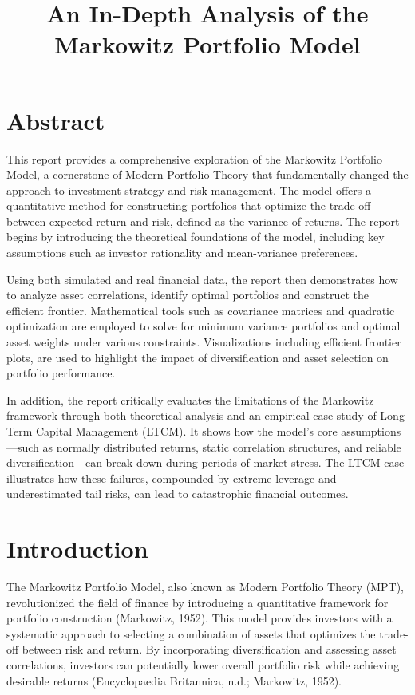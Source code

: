 \documentclass[11pt]{article}
\begin{document}
\title{An In-Depth Analysis of the Markowitz Portfolio Model}
\author{}
\date{}
\maketitle

\section{Abstract}
This report provides a comprehensive exploration of the Markowitz Portfolio Model, a cornerstone of Modern Portfolio Theory that fundamentally changed the approach to investment strategy and risk management. The model offers a quantitative method for constructing portfolios that optimize the trade-off between expected return and risk, defined as the variance of returns. The report begins by introducing the theoretical foundations of the model, including key assumptions such as investor rationality and mean-variance preferences. 

Using both simulated and real financial data, the report then demonstrates how to analyze asset correlations, identify optimal portfolios and construct the efficient frontier. Mathematical tools such as covariance matrices and quadratic optimization are employed to solve for minimum variance portfolios and optimal asset weights under various constraints. Visualizations including efficient frontier plots, are used to highlight the impact of diversification and asset selection on portfolio performance.

In addition, the report critically evaluates the limitations of the Markowitz framework through both theoretical analysis and an empirical case study of Long-Term Capital Management (LTCM). It shows how the model’s core assumptions—such as normally distributed returns, static correlation structures, and reliable diversification—can break down during periods of market stress. The LTCM case illustrates how these failures, compounded by extreme leverage and underestimated tail risks, can lead to catastrophic financial outcomes.


\section{Introduction}
The Markowitz Portfolio Model, also known as Modern Portfolio Theory (MPT), revolutionized the field of finance by introducing a quantitative framework for portfolio construction (Markowitz, 1952). This model provides investors with a systematic approach to selecting a combination of assets that optimizes the trade-off between risk and return. By incorporating diversification and assessing asset correlations, investors can potentially lower overall portfolio risk while achieving desirable returns (Encyclopaedia Britannica, n.d.; Markowitz, 1952). 
\end{document}
